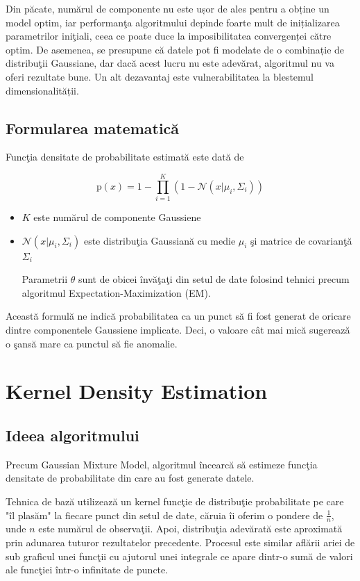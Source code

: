 Din păcate, numărul de componente nu este ușor de ales 
pentru a obține un model optim, iar performanţa algoritmului 
depinde foarte mult de inițializarea parametrilor iniţiali, 
ceea ce poate duce la imposibilitatea convergenței către optim.
De asemenea, se presupune că datele pot fi modelate de o 
combinație de distribuţii Gaussiane, dar dacă acest lucru 
nu este adevărat, algoritmul nu va oferi rezultate bune.
Un alt dezavantaj este vulnerabilitatea la blestemul 
dimensionalității.

\subsection{Formularea matematică}

Funcţia densitate de probabilitate estimată este dată de 

\begin{equation}
    \text{p}(x) = 1 - \prod_{i=1}^{K} \left(1 - \mathcal{N}(x|\mu_i, \Sigma_i)\right)
\end{equation}
    
\begin{itemize}
    \item $K$ este numărul de componente Gaussiene
    \item $\mathcal{N}(x | \mu_i, \Sigma_i)$ este distribuţia Gaussiană
    cu medie $\mu_i$ şi matrice de covarianţă $\Sigma_i$

Parametrii $\theta$ sunt de obicei învăţaţi din setul de date folosind 
tehnici precum algoritmul Expectation-Maximization (EM).
\end{itemize}

Această formulă ne indică probabilitatea ca un punct să fi fost generat de oricare 
dintre componentele Gaussiene implicate. Deci, o valoare cât mai mică sugerează 
o şansă mare ca punctul să fie anomalie.

\section{Kernel Density Estimation}

\subsection{Ideea algoritmului}

Precum Gaussian Mixture Model, algoritmul încearcă să estimeze 
funcţia densitate de probabilitate din care au fost generate datele.

Tehnica de bază utilizează un kernel funcţie de distribuţie probabilitate
pe care "îl plasăm" la fiecare punct din setul de date, căruia îi oferim o pondere 
de $\frac{1}{n}$, unde $n$ este numărul de observaţii. Apoi, distribuţia adevărată
este aproximată prin adunarea tuturor rezultatelor precedente. Procesul este similar 
aflării ariei de sub graficul unei funcţii cu ajutorul unei integrale ce 
apare dintr-o sumă de valori ale funcţiei într-o infinitate de puncte.

